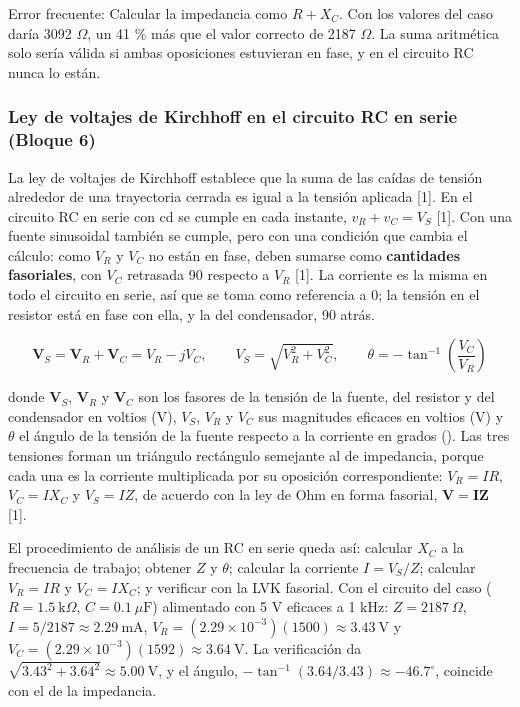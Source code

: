 \documentclass[11pt,letterpaper]{article}
\begin{document}
\begin{nota}{Error frecuente:}
Calcular la impedancia como $R + X_C$. Con los valores del caso daría 3092 \ensuremath{\Omega}, un 41 \% más que el valor correcto de 2187 \ensuremath{\Omega}. La suma aritmética solo sería válida si ambas oposiciones estuvieran en fase, y en el circuito RC nunca lo están.
\end{nota}

\subsubsection{Ley de voltajes de Kirchhoff en el circuito RC en serie (Bloque 6)}

La ley de voltajes de Kirchhoff establece que la suma de las caídas de tensión alrededor de una trayectoria cerrada es igual a la tensión aplicada [1]. En el circuito RC en serie con cd se cumple en cada instante, $v_R + v_C = V_S$ [1]. Con una fuente sinusoidal también se cumple, pero con una condición que cambia el cálculo: como $V_R$ y $V_C$ no están en fase, deben sumarse como \textbf{cantidades fasoriales}, con $V_C$ retrasada 90\textdegree{} respecto a $V_R$ [1]. La corriente es la misma en todo el circuito en serie, así que se toma como referencia a 0\textdegree{}; la tensión en el resistor está en fase con ella, y la del condensador, 90\textdegree{} atrás.

\begin{equation}
  \mathbf{V}_S = \mathbf{V}_R + \mathbf{V}_C = V_R - jV_C, \qquad V_S = \sqrt{V_R^{2} + V_C^{2}}, \qquad \theta = -\tan^{-1}\!\left(\frac{V_C}{V_R}\right)
\end{equation}

donde $\mathbf{V}_S$, $\mathbf{V}_R$ y $\mathbf{V}_C$ son los fasores de la tensión de la fuente, del resistor y del condensador en voltios (V), $V_S$, $V_R$ y $V_C$ sus magnitudes eficaces en voltios (V) y $\theta$ el ángulo de la tensión de la fuente respecto a la corriente en grados (\textdegree{}). Las tres tensiones forman un triángulo rectángulo semejante al de impedancia, porque cada una es la corriente multiplicada por su oposición correspondiente: $V_R = IR$, $V_C = IX_C$ y $V_S = IZ$, de acuerdo con la ley de Ohm en forma fasorial, $\mathbf{V} = \mathbf{I}\mathbf{Z}$ [1].

El procedimiento de análisis de un RC en serie queda así: calcular $X_C$ a la frecuencia de trabajo; obtener $Z$ y $\theta$; calcular la corriente $I = V_S / Z$; calcular $V_R = IR$ y $V_C = IX_C$; y verificar con la LVK fasorial. Con el circuito del caso ($R = 1.5\ \text{k}\Omega$, $C = 0.1\ \mu\text{F}$) alimentado con 5 V eficaces a 1 kHz: $Z = 2187\ \Omega$, $I = 5 / 2187 \approx 2.29\ \text{mA}$, $V_R = (2.29 \times 10^{-3})(1500) \approx 3.43\ \text{V}$ y $V_C = (2.29 \times 10^{-3})(1592) \approx 3.64\ \text{V}$. La verificación da $\sqrt{3.43^2 + 3.64^2} \approx 5.00\ \text{V}$, y el ángulo, $-\tan^{-1}(3.64/3.43) \approx -46.7^\circ$, coincide con el de la impedancia.
\end{document}

